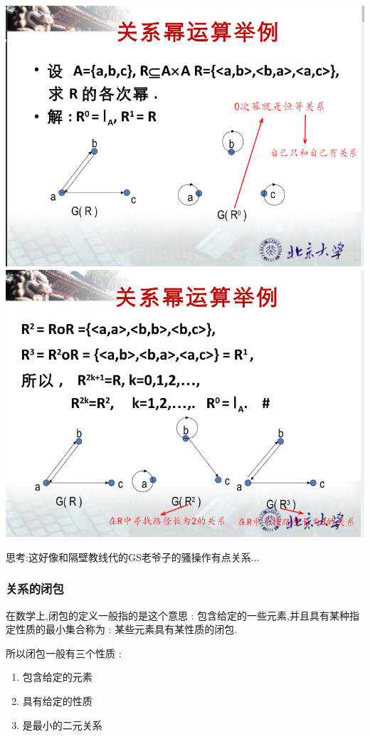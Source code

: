 {{{{    \begin{center}
      \includegraphics{resources/depend_power_example_1.png}
      \includegraphics{resources/depend_power_example.png}
    \end{center}
  }

  思考:这好像和隔壁教线代的GS老爷子的骚操作有点关系...
}%

\subsubsection{关系的闭包}{
  在数学上,闭包的定义一般指的是这个意思 : 包含给定的一些元素,并且具有某种指定性质的最小集合称为 : 某些元素具有某性质的闭包.

  所以闭包一般有三个性质 : \begin{enumerate}
    \item 包含给定的元素
    \item 具有给定的性质
    \item 是最小的二元关系
  \end{enumerate}

}}}
